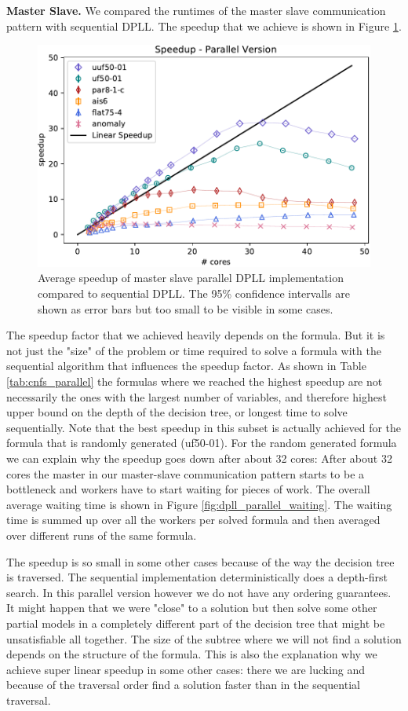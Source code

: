 \documentclass[letterpaper]{article}
\newcommand{\mypar}[1]{{\bf #1.}}
\begin{document}
\mypar{Master Slave}
We compared the runtimes of the master slave communication pattern with sequential DPLL.
The speedup that we achieve is shown in Figure \ref{fig:dpll_parallel_speedup}.
\begin{figure}
    \centering
    \includegraphics[width=\columnwidth]{figures/scaling_parallel_subset_dpll_scaling_tar.pdf}
    \caption{Average speedup of master slave parallel DPLL implementation compared to sequential DPLL.
    The 95\% confidence intervalls are shown as error bars but too small to be visible in some cases.
    \label{fig:dpll_parallel_speedup}}
\end{figure}
The speedup factor that we achieved heavily depends on the formula.
But it is not just the "size" of the problem or time required to solve a formula with the sequential algorithm that influences the speedup factor.
As shown in Table \ref{tab:cnfs_parallel} the formulas where we reached the highest speedup are not necessarily the ones with the largest number of variables, and therefore highest upper bound on the depth of the decision tree, or longest time to solve sequentially.
Note that the best speedup in this subset is actually achieved for the formula that is randomly generated (uf50-01).
For the random generated formula we can explain why the speedup goes down after about 32 cores:
After about 32 cores the master in our master-slave communication pattern starts to be a bottleneck and workers have to start waiting for pieces of work.
The overall average waiting time is shown in Figure \ref{fig:dpll_parallel_waiting}.
The waiting time is summed up over all the workers per solved formula and then averaged over different runs of the same formula.

The speedup is so small in some other cases because of the way the decision tree is traversed.
The sequential implementation deterministically does a depth-first search.
In this parallel version however we do not have any ordering guarantees.
It might happen that we were "close" to a solution but then solve some other partial models in a completely different part of the decision tree that might be unsatisfiable all together.
The size of the subtree where we will not find a solution depends on the structure of the formula.
This is also the explanation why we achieve super linear speedup in some other cases: there we are lucking and because of the traversal order find a solution faster than in the sequential traversal.
\end{document}
